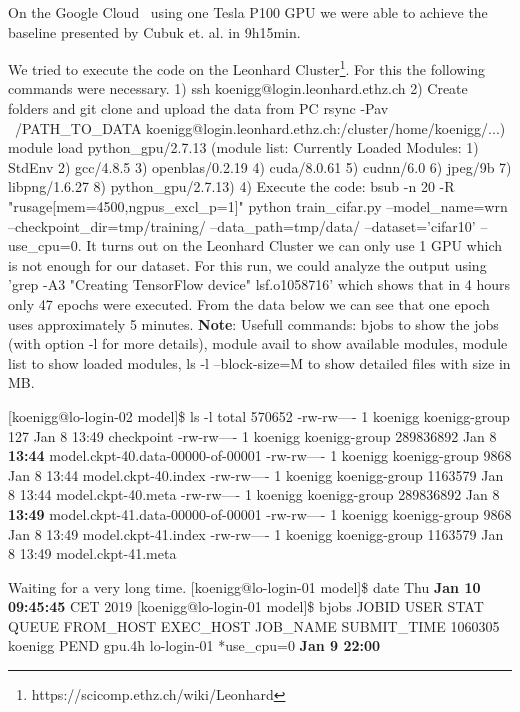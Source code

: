 \documentclass[10pt,twocolumn,letterpaper]{article}
\begin{document}
On the Google Cloud~\cite{GCloud} using one Tesla P100 GPU we were able to achieve the baseline presented by Cubuk et. al. in 9h15min.\newline

We tried to execute the code on the Leonhard Cluster\footnote{https://scicomp.ethz.ch/wiki/Leonhard}. For this the following commands were necessary. 1) ssh koenigg@login.leonhard.ethz.ch 2) Create folders and git clone and upload the data from PC rsync -Pav ~/PATH\_TO\_DATA koenigg@login.leonhard.ethz.ch:/cluster/home/koenigg/...) module load python\_gpu/2.7.13 (module list: Currently Loaded Modules: 1) StdEnv   2) gcc/4.8.5   3) openblas/0.2.19   4) cuda/8.0.61   5) cudnn/6.0   6) jpeg/9b   7) libpng/1.6.27   8) python\_gpu/2.7.13) 4) Execute the code: bsub -n 20 -R "rusage[mem=4500,ngpus\_excl\_p=1]" python train\_cifar.py --model\_name=wrn --checkpoint\_dir=tmp/training/ --data\_path=tmp/data/ --dataset='cifar10' --use\_cpu=0. It turns out on the Leonhard Cluster we can only use 1 GPU which is not enough for our dataset. For this run, we could analyze the output using 'grep -A3 "Creating TensorFlow device" lsf.o1058716' which shows that in 4 hours only 47 epochs were executed. From the data below we can see that one epoch uses approximately 5 minutes. \textbf{Note}: Usefull commands: bjobs to show the jobs (with option -l for more details), module avail to show available modules, module list to show loaded modules, ls -l --block-size=M to show detailed files with size in MB. \newline

[koenigg@lo-login-02 model]\$ ls -l
total 570652
-rw-rw---- 1 koenigg koenigg-group       127 Jan  8 13:49 checkpoint
-rw-rw---- 1 koenigg koenigg-group 289836892 Jan  8 \textbf{13:44} model.ckpt-40.data-00000-of-00001
-rw-rw---- 1 koenigg koenigg-group      9868 Jan  8 13:44 model.ckpt-40.index
-rw-rw---- 1 koenigg koenigg-group   1163579 Jan  8 13:44 model.ckpt-40.meta
-rw-rw---- 1 koenigg koenigg-group 289836892 Jan  8 \textbf{13:49} model.ckpt-41.data-00000-of-00001
-rw-rw---- 1 koenigg koenigg-group      9868 Jan  8 13:49 model.ckpt-41.index
-rw-rw---- 1 koenigg koenigg-group   1163579 Jan  8 13:49 model.ckpt-41.meta \newline

Waiting for a very long time.
[koenigg@lo-login-01 model]\$ date
Thu \textbf{Jan 10 09:45:45} CET 2019
[koenigg@lo-login-01 model]\$ bjobs
JOBID      USER    STAT  QUEUE      FROM\_HOST   EXEC\_HOST   JOB\_NAME   SUBMIT\_TIME
1060305    koenigg PEND  gpu.4h     lo-login-01             *use\_cpu=0 \textbf{Jan  9 22:00}\newline
\end{document}
